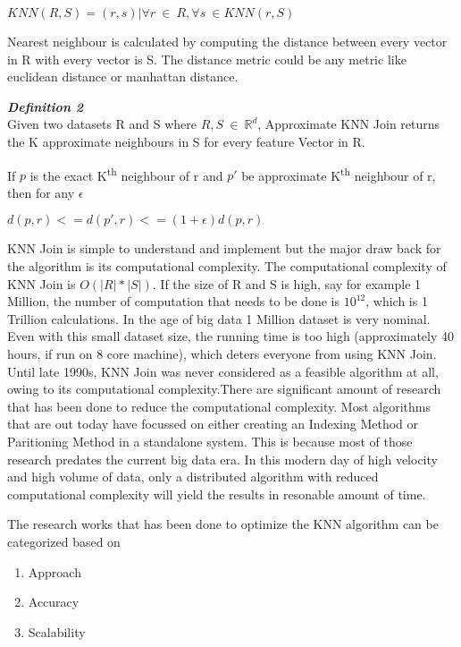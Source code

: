 \medskip

\begin{center}
     $KNN(R,S) = {(r,s) | \forall r\ \in\ R, \forall s\ \in KNN(r,S)
     } $
\end{center}

Nearest neighbour is calculated by computing the distance between every vector
in R with every vector is S. The distance metric could be any metric
like euclidean distance or manhattan distance.

\medskip

\textbf{\emph{Definition 2}} \\
 Given two datasets R and S where $R,S\ \in\ \mathbb{R}^d$, Approximate KNN Join returns the K
approximate neighbours in S for every feature Vector in R.

\medskip

If $p$ is the exact K\textsuperscript{th} neighbour of r and $p'$ be approximate
K\textsuperscript{th} neighbour of r, then for any $\epsilon$

\bigskip

\begin{center}
$d(p,r) <= d(p',r) <= (1+\epsilon) d(p,r)$
\end{center}

\bigskip

KNN Join is simple to understand and implement but the major draw back
for the algorithm is its computational complexity. The computational
complexity of KNN Join is $ O(|R|*|S|)$. If the size of R and S is high,
say for example 1 Million, the number of computation that needs to be
done is $10^{12}$, which is 1 Trillion calculations. In the age of big data 1
Million dataset is very nominal. Even with this small dataset size, the
running time is too high (approximately 40 hours, if run on 8 core machine), which
deters everyone from using KNN Join. Until late 1990s, KNN Join was
never considered as a feasible algorithm at all, owing to its computational
complexity.There are significant amount of research that has been done to reduce the
computational complexity. Most algorithms that are out today have focussed
on either creating an Indexing Method or Paritioning Method in a standalone system. This is because most of those research predates the
current big data era. In this modern day of high velocity and high volume of data,
only a distributed algorithm with reduced computational complexity will yield the results in resonable amount of time.

The research works that has been done to optimize the KNN algorithm can be categorized based on
\begin{enumerate}
\item Approach
\item Accuracy
\item Scalability
\end{enumerate}



